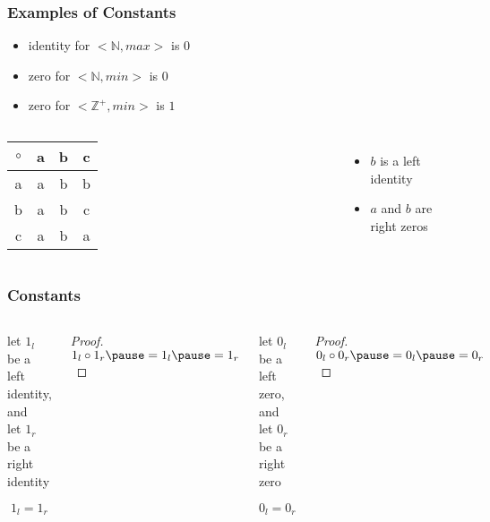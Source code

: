 \documentclass[dvipsnames]{beamer}
\begin{document}
\begin{frame}
  \frametitle{Examples of Constants}

  \begin{example}
    \begin{itemize}
      \item identity for $<\mathbb{N}, max>$ is $0$
      \item zero for $<\mathbb{N}, min>$ is $0$
      \item zero for $<\mathbb{Z}^+, min>$ is $1$
    \end{itemize}
  \end{example}

  \pause
  \begin{example}
    \begin{columns}
      \begin{tabular}{c||c|c|c}
        $\circ$ & a & b & c\\\hline\hline
              a & a & b & b\\\hline
              b & a & b & c\\\hline
              c & a & b & a
      \end{tabular}

      \begin{itemize}
        \item $b$ is a left identity
        \item $a$ and $b$ are right zeros
      \end{itemize}
    \end{columns}
  \end{example}
\end{frame}

\begin{frame}
  \frametitle{Constants}

  \begin{columns}
    \begin{theorem}
      let $1_l$ be a left identity, and\\
      let $1_r$ be a right identity

      \[ 1_l = 1_r \]
    \end{theorem}

    \pause
    \begin{proof}
      $1_l \circ 1_r \pause = 1_l \pause = 1_r$
    \end{proof}

    \pause
    \begin{theorem}
      let $0_l$ be a left zero, and\\
      let $0_r$ be a right zero

      \[ 0_l = 0_r \]
    \end{theorem}

    \pause
    \begin{proof}
      $0_l \circ 0_r \pause = 0_l \pause = 0_r$
    \end{proof}
  \end{columns}
\end{frame}
\end{document}
